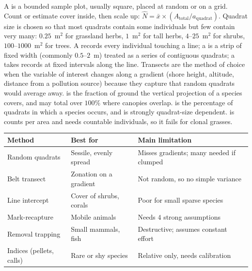 \begin{defbox}[title={DEFINITIONS: the plot and line methods}]
A  is a bounded sample plot, usually square, placed at random or on a
grid. Count or estimate cover inside, then scale up:
$\hat{N}=\bar{x}\times(A_{\text{total}}/a_{\text{quadrat}})$. Quadrat size is
chosen so that most quadrats contain some individuals but few contain very many:
$0.25$~m$^2$ for grassland herbs, $1$~m$^2$ for tall herbs, $4$--$25$~m$^2$ for
shrubs, $100$--$1000$~m$^2$ for trees.
A  records every individual touching a line; a  is a strip of fixed width (commonly $0.5$--$2$~m) treated as a series
of contiguous quadrats; a  takes records at fixed intervals
along the line. Transects are the method of choice when the variable of interest
changes along a gradient (shore height, altitude, distance from a pollution
source) because they capture  that random quadrats would average
away.
 is the fraction of ground the vertical projection of a
species covers, and may total over $100\%$ where canopies overlap.
 is the percentage of quadrats in which a species occurs, and is
strongly quadrat-size dependent.  is counts per area and needs
countable individuals, so it fails for clonal grasses.
\end{defbox}

\begin{tabular}{@{}lp{3.2cm}p{4.4cm}@{}}
\toprule
\textbf{Method} & \textbf{Best for} & \textbf{Main limitation}\\
\midrule
Random quadrats & Sessile, evenly spread & Misses gradients; many needed if clumped\\
Belt transect & Zonation on a gradient & Not random, so no simple variance\\
Line intercept & Cover of shrubs, corals & Poor for small sparse species\\
Mark-recapture & Mobile animals & Needs $4$ strong assumptions\\
Removal trapping & Small mammals, fish & Destructive; assumes constant effort\\
Indices (pellets, calls) & Rare or shy species & Relative only, needs calibration\\
\bottomrule
\end{tabular}

